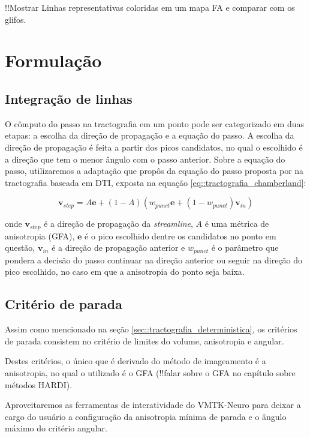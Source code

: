 \documentclass[
    12pt,                %
    oneside,            %
    a4paper,            %
    english,            %
    french,                %
    spanish,            %
    brazil                %
    ]{abntex2}
\begin{document}
!!Mostrar Linhas representativas coloridas em um mapa FA e comparar com os glifos.


\section{Formulação}

\subsection{Integração de linhas}

O cômputo do passo na tractografia em um ponto pode ser categorizado em duas etapas: a escolha da direção de propagação e a equação do passo. A escolha da direção de propagação é feita a partir dos picos candidatos, no qual o escolhido é a direção que tem o menor ângulo com o passo anterior. Sobre a equação do passo, utilizaremos a adaptação que  propôs da equação do passo proposta por  na tractografia baseada em DTI, exposta na equação \ref{eq::tractografia_chamberland}:

\begin{equation}
\label{eq::tractografia_chamberland}
    \mathbf{v}_{step} = A\mathbf{e} + (1 - A)(w_{punct}\mathbf{e} + (1-w_{punct})\mathbf{v}_{in})
\end{equation}

onde $\mathbf{v}_{step}$ é a direção de propagação da \textit{streamline}, $A$ é uma métrica de anisotropia (GFA), $\mathbf{e}$ é o pico escolhido dentre os candidatos no ponto em questão, $\mathbf{v}_{in}$ é a direção de propagação anterior e $w_{punct}$ é o parâmetro que pondera a decisão do passo continuar na direção anterior ou seguir na direção do pico escolhido, no caso em que a anisotropia do ponto seja baixa.

\subsection{Critério de parada}

Assim como mencionado na seção \ref{sec::tractografia_deterministica}, os critérios de parada consistem no critério de limites do volume, anisotropia e angular.

Destes critérios, o único que é derivado do método de imageamento é a anisotropia, no qual o utilizado é o GFA (!!falar sobre o GFA no capítulo sobre métodos HARDI).

Aproveitaremos as ferramentas de interatividade do VMTK-Neuro para deixar a cargo do usuário a configuração da anisotropia mínima de parada e o ângulo máximo do critério angular.
\end{document}
